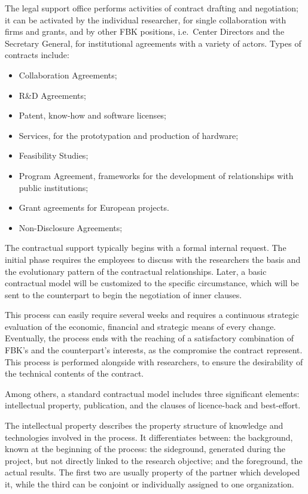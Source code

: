The legal support office performs activities of contract drafting and negotiation; it can be activated by the individual researcher, for single collaboration with firms and grants, and by other FBK positions, i.e.\ Center Directors and the Secretary General, for institutional agreements with a variety of actors. Types of contracts include:

\begin{itemize}

\item Collaboration Agreements; 
\item R\&D Agreements; 
\item Patent, know-how and software licenses; 
\item Services, for the prototypation and production of hardware;
\item Feasibility Studies; 
\item Program Agreement, frameworks for the development of relationships with public institutions; 
\item Grant agreements for European projects. 
\item Non-Disclosure Agreements; 

\end{itemize}

The contractual support typically begins with a formal internal request. The initial phase requires the employees to discuss with the researchers the basis and the evolutionary pattern of the contractual relationships. Later, a basic contractual model will be customized to the specific circumstance, which will be sent to the counterpart to begin the negotiation of inner clauses. 
 
This process can easily require several weeks and requires a continuous strategic evaluation of the economic, financial and strategic means of every change. Eventually, the process ends with the reaching of a satisfactory combination of FBK’s and the counterpart’s interests, as the compromise the contract represent. This process is performed alongside with researchers, to ensure the desirability of the technical contents of the contract.

Among others, a standard contractual model includes three significant elements: intellectual property, publication, and the clauses of licence-back and best-effort.

The intellectual property describes the property structure of knowledge and technologies involved in the process. It differentiates between: the background, known at the beginning of the process: the sideground, generated during the project, but not directly linked to the research objective; and the foreground, the actual results. The first two are usually property of the partner which developed it, while the third can be conjoint or individually assigned to one organization. 


